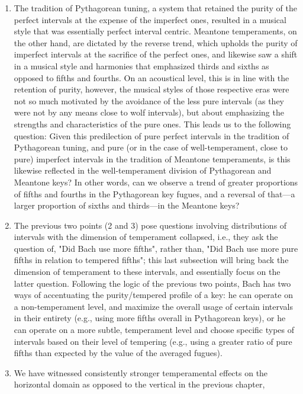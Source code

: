 \begin{enumerate}
\item
  The tradition of Pythagorean tuning, a system that retained the purity
  of the perfect intervals at the expense of the imperfect ones,
  resulted in a musical style that was essentially perfect interval
  centric. Meantone temperaments, on the other hand, are dictated by the
  reverse trend, which upholds the purity of imperfect intervals at the
  sacrifice of the perfect ones, and likewise saw a shift in a musical
  style and harmonies that emphasized thirds and sixths as opposed to
  fifths and fourths. On an acoustical level, this is in line with the
  retention of purity, however, the musical styles of those respective
  eras were not so much motivated by the avoidance of the less pure
  intervals (as they were not by any means close to wolf intervals), but
  about emphasizing the strengths and characteristics of the pure ones.
  This leads us to the following question: Given this predilection of
  pure perfect intervals in the tradition of Pythagorean tuning, and
  pure (or in the case of well-temperament, close to pure) imperfect
  intervals in the tradition of Meantone temperaments, is this likewise
  reflected in the well-temperament division of Pythagorean and Meantone
  keys? In other words, can we observe a trend of greater proportions of
  fifths and fourths in the Pythagorean key fugues, and a reversal of
  that---a larger proportion of sixths and thirds---in the
  Meantone keys?
\item
  The previous two points (2 and 3) pose questions involving
  distributions of intervals with the dimension of temperament
  collapsed, i.e., they ask the question of, "Did Bach use more fifths",
  rather than, "Did Bach use more pure fifths in relation to tempered
  fifths"; this last subsection will bring back the dimension of
  temperament to these intervals, and essentially focus on the latter
  question. Following the logic of the previous two points, Bach has two
  ways of accentuating the purity/tempered profile of a key: he can
  operate on a non-temperament level, and maximize the overall usage of
  certain intervals in their entirety (e.g., using more fifths overall
  in Pythagorean keys), or he can operate on a more subtle, temperament
  level and choose specific types of intervals based on their level of
  tempering (e.g., using a greater ratio of pure fifths than expected by
  the value of the averaged fugues).
\item
  We have witnessed consistently stronger temperamental effects on the
  horizontal domain as opposed to the vertical in the previous chapter,

\end{enumerate}
